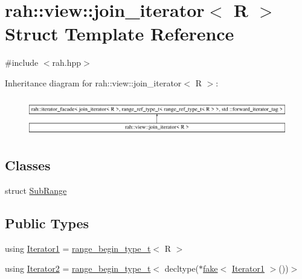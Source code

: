 \hypertarget{structrah_1_1view_1_1join__iterator}{}\section{rah\+::view\+::join\+\_\+iterator$<$ R $>$ Struct Template Reference}
\label{structrah_1_1view_1_1join__iterator}


{\ttfamily \#include $<$rah.\+hpp$>$}

Inheritance diagram for rah\+::view\+::join\+\_\+iterator$<$ R $>$\+:\begin{figure}[H]
\begin{center}
\leavevmode
\includegraphics[height=1.686747cm]{structrah_1_1view_1_1join__iterator}
\end{center}
\end{figure}
\subsection*{Classes}
\begin{DoxyCompactItemize}
\item 
struct \mbox{\hyperlink{structrah_1_1view_1_1join__iterator_1_1_sub_range}{Sub\+Range}}
\end{DoxyCompactItemize}
\subsection*{Public Types}
\begin{DoxyCompactItemize}
\item 
using \mbox{\hyperlink{structrah_1_1view_1_1join__iterator_a8b71c6f25eee2915e2a8afc6e024196d}{Iterator1}} = \mbox{\hyperlink{namespacerah_a28aff4eeddcece6be65ff0b956d32d4a}{range\+\_\+begin\+\_\+type\+\_\+t}}$<$ R $>$
\item 
using \mbox{\hyperlink{structrah_1_1view_1_1join__iterator_ae03a066174f3422c70d0e3c22e68d9f7}{Iterator2}} = \mbox{\hyperlink{namespacerah_a28aff4eeddcece6be65ff0b956d32d4a}{range\+\_\+begin\+\_\+type\+\_\+t}}$<$ decltype($\ast$\mbox{\hyperlink{namespacerah_a11785bbdf970efa1bc57fc14993b77bf}{fake}}$<$ \mbox{\hyperlink{structrah_1_1view_1_1join__iterator_a8b71c6f25eee2915e2a8afc6e024196d}{Iterator1}} $>$())$>$
\end{DoxyCompactItemize}
